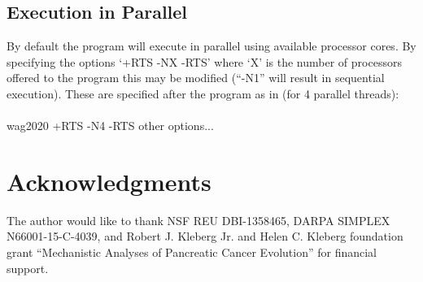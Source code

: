 \documentclass[11pt]{memoir}
\begin{document}
	
	\subsection{Execution in Parallel}
	By default the program will execute in parallel using available processor cores.  By specifying the options `+RTS -NX -RTS' where `X' is the number of processors offered to the program this may be modified (``-N1'' will result in sequential execution). These are specified after the program as in (for 4 parallel threads):\\
	\\
	wag2020 +RTS -N4 -RTS other options...  \\
	
	\section*{Acknowledgments}
	The author would like to thank NSF REU DBI-1358465, DARPA SIMPLEX N66001-15-C-4039, and Robert J. Kleberg Jr. and Helen C. Kleberg foundation grant ``Mechanistic Analyses of Pancreatic Cancer Evolution'' for financial support.  
	
	
\end{document}

